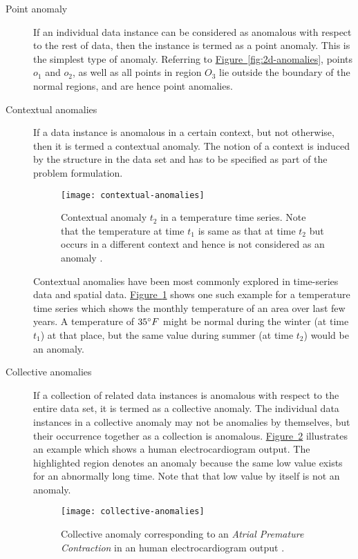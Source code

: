 \begin{description}

\item[Point anomaly] If an individual data instance can be considered as 
anomalous with respect to the rest of data, then the instance is termed as a 
point anomaly. This is the simplest type of anomaly. Referring to 
\hyperref[fig:2d-anomalies]{Figure~\ref{fig:2d-anomalies}}, points $o_{1}$ and 
$o_{2}$, as well as all points in region $O_{3}$ lie outside the boundary of the
normal regions, and are hence point anomalies.

\item[Contextual anomalies] If a data instance is anomalous in a certain 
context, but not otherwise, then it is termed a contextual anomaly. The notion 
of a context is induced by the structure in the data set and has to be specified
as part of the problem formulation.

\begin{figure}
	\centering
	\texttt{[image: contextual-anomalies]}
	\caption[Contextual anomaly $t_{2}$ in a temperature time series.]{
		Contextual anomaly $t_{2}$ in a temperature time series. Note that the 
		temperature at time $t_{1}$ is same as that at time $t_{2}$ but occurs 
		in a different context and hence is not considered as an anomaly 
		\cite{Chandola:2007}.}
	\label{fig:contextual-anomalies}
\end{figure}

Contextual anomalies have been most commonly explored in time-series data and 
spatial data. \hyperref[fig:contextual-anomalies]
{Figure~\ref{fig:contextual-anomalies}} shows one such example for a temperature
time series which shows the monthly temperature of an area over last few years. 
A temperature of $35^\circ F$ might be normal during the winter (at time 
$t_{1}$) at that place, but the same value during summer (at time $t_{2}$) would
be an anomaly.

\item[Collective anomalies] If a collection of related data instances is 
anomalous with respect to the entire data set, it is termed as a collective 
anomaly. The individual data instances in a collective anomaly may not be 
anomalies by themselves, but their occurrence together as a collection is 
anomalous. \hyperref[fig:collective-anomalies]
{Figure~\ref{fig:collective-anomalies}} illustrates an example which shows a 
human electrocardiogram output. The highlighted region denotes an anomaly 
because the same low value exists for an abnormally long time. Note that that 
low value by itself is not an anomaly.

\begin{figure}
	\centering
	\texttt{[image: collective-anomalies]}
	\caption[Collective anomaly corresponding to an \emph{Atrial Premature 
		Contraction} in an human electrocardiogram output.]{Collective anomaly 
		corresponding to an \emph{Atrial Premature Contraction} in an human 
		electrocardiogram output \cite{Goldberger:2000}.}
	\label{fig:collective-anomalies}
\end{figure}

\end{description}

